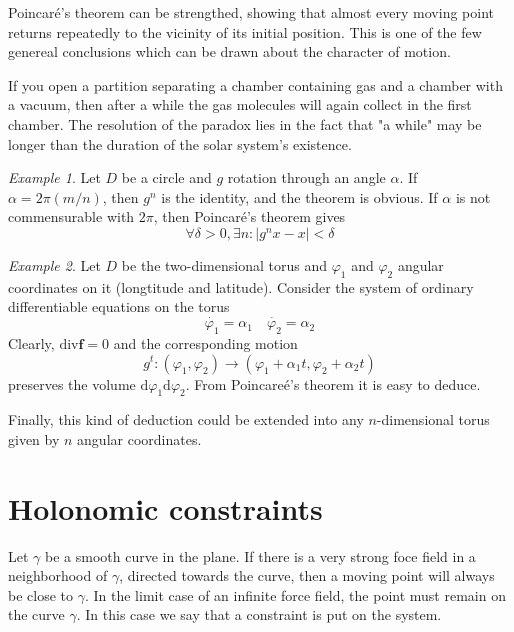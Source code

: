 \documentclass[conference]{IEEEtran}
\theoremstyle{definition}
\theoremstyle{remark}
\newtheorem{exmp}{Example}
\begin{document}
    Poincar\'{e}'s theorem can be strengthed, showing that almost every moving point returns repeatedly to the vicinity of its initial position. This is one of the few genereal conclusions which can be drawn about the character of motion.

    If you open a partition separating a chamber containing gas and a chamber with a vacuum, then after a while the gas molecules will again collect in the first chamber. The resolution of the paradox lies in the fact that "a while" may be longer than the duration of the solar system's existence.

    \begin{exmp}
        Let $D$ be a circle and $g$ rotation through an angle $\alpha$. If $\alpha = 2\pi(m/n)$, then $g^n$ is the identity, and the theorem is obvious. If $\alpha$ is not commensurable with $2\pi$, then Poincar\'{e}'s theorem gives
        \begin{equation*}
            \forall \delta > 0, \exists n: | g^n x - x | < \delta
        \end{equation*}
    \end{exmp}

    \begin{exmp}
        Let $D$ be the two-dimensional torus and $\varphi_1$ and $\varphi_2$ angular coordinates on it (longtitude and latitude). Consider the system of ordinary differentiable equations on the torus
        \begin{equation*}
            \dot{\varphi_1} = \alpha_1 \quad \dot{\varphi_2} = \alpha_2
        \end{equation*}
        Clearly, $\mathrm{div} \mathbf{f} = 0$ and the corresponding motion
        \begin{equation*}
            g^t: (\varphi_1, \varphi_2) \to (\varphi_1 + \alpha_1 t, \varphi_2 + \alpha_2 t)
        \end{equation*}
        preserves the volume $\mathrm{d} \varphi_1 \mathrm{d} \varphi_2$. From Poincare\'{e}'s theorem it is easy to deduce.
    \end{exmp}

    Finally, this kind of deduction could be extended into any $n$-dimensional torus given by $n$ angular coordinates.

    \section{Holonomic constraints}
    Let $\gamma$ be a smooth curve in the plane. If there is a very strong foce field in a neighborhood of $\gamma$, directed towards the curve, then a moving point will always be close to $\gamma$. In the limit case of an infinite force field, the point must remain on the curve $\gamma$. In this case we say that a constraint is put on the system.
    
\end{document}
